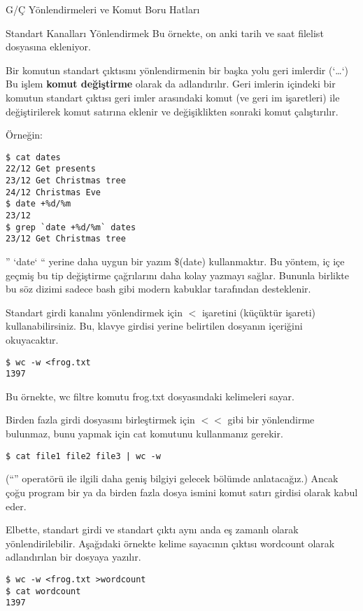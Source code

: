 \begin{section}{G/Ç Yönlendirmeleri ve Komut Boru Hatları}
\begin{subsection}{Standart Kanalları Yönlendirmek}
Bu örnekte, on anki tarih ve saat filelist dosyasına ekleniyor.

Bir komutun standart çıktısını yönlendirmenin bir başka yolu geri imlerdir (`\ldots`) Bu işlem \textbf{komut değiştirme} olarak da adlandırılır. Geri imlerin içindeki bir komutun standart çıktısı geri imler arasındaki komut (ve geri im işaretleri) ile değiştirilerek komut satırına eklenir ve değişiklikten sonraki komut çalıştırılır.

Örneğin:
\footnotesize
\begin{verbatim}
$ cat dates
22/12 Get presents
23/12 Get Christmas tree
24/12 Christmas Eve
$ date +%d/%m
23/12
$ grep `date +%d/%m` dates
23/12 Get Christmas tree
\end{verbatim}
\normalsize

” `date` “ yerine daha uygun bir yazım \$(date) kullanmaktır. Bu yöntem, iç içe geçmiş bu tip değiştirme çağrılarını daha kolay yazmayı sağlar. Bununla birlikte bu söz dizimi sadece bash gibi modern kabuklar tarafından desteklenir.

Standart girdi kanalını yönlendirmek için $<$ işaretini (küçüktür işareti) kullanabilirsiniz. Bu, klavye girdisi yerine belirtilen dosyanın içeriğini okuyacaktır.

\footnotesize
\begin{verbatim}
$ wc -w <frog.txt
1397
\end{verbatim}
\normalsize

Bu örnekte, wc filtre komutu frog.txt dosyasındaki kelimeleri sayar.

Birden fazla girdi dosyasını birleştirmek için $<<$ gibi bir yönlendirme bulunmaz, bunu yapmak için cat komutunu kullanmanız gerekir.

\footnotesize
\begin{verbatim}
$ cat file1 file2 file3 | wc -w
\end{verbatim}
\normalsize

(“\textbar” operatörü ile ilgili daha geniş bilgiyi gelecek bölümde anlatacağız.) Ancak çoğu program bir ya da birden fazla dosya ismini komut satırı girdisi olarak kabul eder.

Elbette, standart girdi ve standart çıktı aynı anda eş zamanlı olarak yönlendirilebilir.  Aşağıdaki örnekte kelime sayacının çıktısı wordcount olarak adlandırılan bir dosyaya yazılır.

\footnotesize
\begin{verbatim}
$ wc -w <frog.txt >wordcount
$ cat wordcount
1397
\end{verbatim}
\normalsize


\end{subsection}
\end{section}
